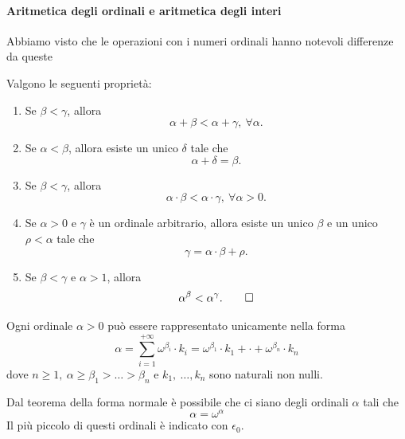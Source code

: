 \paragraph{Aritmetica degli ordinali e aritmetica degli interi}
Abbiamo visto che le operazioni con i numeri ordinali hanno notevoli differenze da queste 
\begin{property}
	Valgono le seguenti proprietà:
	\begin{enumerate}
		\item Se $\beta<\gamma$, allora
		\begin{equation*}
			\alpha+\beta<\alpha+\gamma,\ \forall \alpha.
		\end{equation*}
		\item Se $\alpha<\beta$, allora esiste un unico $\delta$ tale che \begin{equation*}
			\alpha+\delta=\beta.
		\end{equation*}
		\item Se $\beta<\gamma$, allora
		\begin{equation*}
			\alpha\cdot \beta<\alpha\cdot\gamma,\ \forall \alpha>0.
		\end{equation*}
		\item Se $\alpha>0$ e $\gamma$ è un ordinale arbitrario, allora esiste un unico $\beta$ e un unico $\rho<\alpha$ tale che
		\begin{equation*}
			\gamma=\alpha\cdot\beta+\rho.
		\end{equation*}
		\item Se $\beta<\gamma$ e $\alpha>1$, allora
		\begin{equation*}
			\alpha^{\beta}<\alpha^{\gamma}.\qedhere
		\end{equation*}
	\end{enumerate}
\end{property}
\begin{theoremaqed}
	Ogni ordinale $\alpha>0$ può essere rappresentato unicamente nella forma
	\begin{equation}
		\alpha=\sum_{i=1}^{+\infty}\omega^{\beta_i}\cdot k_i=\omega^{\beta_1}\cdot k_1+\cdot+\omega^{\beta_n}\cdot k_n
	\end{equation}
dove $n\geq 1,\ \alpha\geq \beta_1>\ldots>\beta_n$ e $k_1,\ \ldots, k_n$ sono naturali non nulli.
\end{theoremaqed}
Dal teorema della forma normale è possibile che ci siano degli ordinali $\alpha$ tali che
\begin{equation*}
	\alpha=\omega^{\alpha}
\end{equation*}
Il più piccolo di questi ordinali è indicato con $\epsilon_0$.
